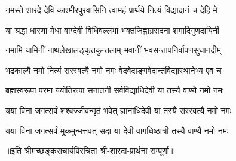 

\twolineshloka
{नमस्ते शारदे देवि काश्मीरपुरवासिनि}
{त्वामहं प्रार्थये नित्यं विद्यादानं च देहि मे}

\twolineshloka
{या श्रद्धा धारणा मेधा वाग्देवी विधिवल्लभा}
{भक्तजिह्वाग्रसदना शमादिगुणदायिनी}

\twolineshloka
{नमामि यामिनीं नाथलेखालङ्कृतकुन्तलाम्}
{भवानीं भवसन्तापनिर्वापणसुधानदीम्}

\twolineshloka
{भद्रकाल्यै नमो नित्यं सरस्वत्यै नमो नमः}
{वेदवेदाङ्गवेदान्तविद्यास्थानेभ्य एव च}

\twolineshloka
{ब्रह्मस्वरूपा परमा ज्योतिरूपा सनातनी}
{सर्वविद्याधिदेवी या तस्यै वाण्यै नमो नमः}

\twolineshloka
{यया विना जगत्सर्वं शश्वज्जीवन्मृतं भवेत्}
{ज्ञानाधिदेवी या तस्यै सरस्वत्यै नमो नमः}

\twolineshloka
{यया विना जगत्सर्वं मूकमुन्मत्तवत् सदा}
{या देवी वागधिष्ठात्री तस्यै वाण्यै नमो नमः}

॥इति श्रीमच्छङ्कराचार्यविरचिता श्री-शारदा-प्रार्थना सम्पूर्णा॥
